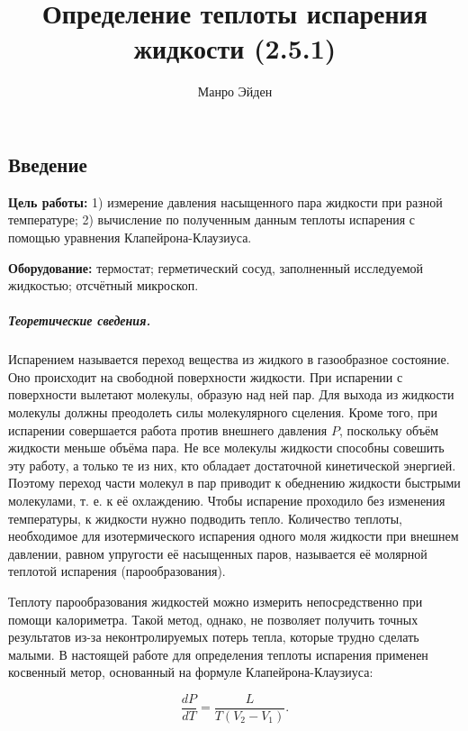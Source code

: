 \documentclass[a4paper, 12pt]{article}
\title{\textbf{Определение теплоты испарения жидкости (2.5.1)}}
\author{Манро Эйден}
\date{}
\begin{document}
\maketitle

\begin{center}
    \section*{Введение}
\end{center}

\noindent \textbf{Цель работы:} 1) измерение давления насыщенного пара жидкости при разной температуре; 2) вычисление по полученным данным теплоты испарения с помощью уравнения Клапейрона-Клаузиуса. 
\bigskip

\noindent \textbf{Оборудование:} термостат; герметический сосуд, заполненный исследуемой жидкостью; отсчётный микроскоп. 

\bigskip

\subparagraph*{Теоретические сведения.} 

Испарением называется переход вещества из жидкого в газообразное состояние. Оно происходит на свободной поверхности жидкости. При испарении с поверхности вылетают молекулы, образую над ней пар. Для выхода из жидкости молекулы должны преодолеть силы молекулярного сцеления. Кроме того, при испарении совершается работа против внешнего давления $P$, поскольку объём жидкости меньше объёма пара. Не все молекулы жидкости способны совешить эту работу, а только те из них, кто обладает достаточной кинетической энергией. Поэтому переход части молекул в пар приводит к обеднению жидкости быстрыми молекулами, т. е. к её охлаждению. Чтобы испарение проходило без изменения температуры, к жидкости нужно подводить тепло. Количество теплоты, необходимое для изотермического испарения одного моля жидкости при внешнем давлении, равном упругости её насыщенных паров, называется её молярной теплотой испарения (парообразования). 

Теплоту парообразования жидкостей можно измерить непосредственно при помощи калориметра. Такой метод, однако, не позволяет получить точных результатов из-за неконтролируемых потерь тепла, которые трудно сделать малыми. В настоящей работе для определения теплоты испарения применен косвенный метор, основанный на формуле Клапейрона-Клаузиуса: 

\bigskip

\begin{equation} \label{kk}
 	\dfrac{dP}{dT}= \dfrac{L}{T(V_2 - V_1)}. 
\end{equation}
\end{document}

